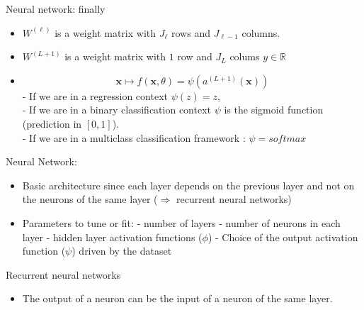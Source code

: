 \documentclass[ignorenonframetext,]{beamer}
\providecommand{\tightlist}{%
  \setlength{\itemsep}{0pt}\setlength{\parskip}{0pt}}
\begin{document}
\begin{frame}{Neural network: finally}
\protect\hypertarget{neural-network-finally}{}

\begin{itemize}
\tightlist
\item
  \(W^{(\ell)}\) is a weight matrix with \(J_{\ell}\) rows and
  \(J_{\ell-1}\) columns.\\
\item
  \(W^{(L+1)}\) is a weight matrix with \(1\) row and \(J_{L}\) colums
  \(y \in \mathbb{R}\)
\item
  \[\mathbf{x} \mapsto f(\mathbf{x},\theta) = \psi(a^{(L+1)}(\mathbf{x}))\]
  - If we are in a regression context \(\psi(z) = z\),\\
  - If we are in a binary classification context \(\psi\) is the sigmoid
  function (prediction in \([0,1]\)).\\
  - If we are in a multiclass classification framework :
  \(\psi = softmax\)
\end{itemize}

\end{frame}

\begin{frame}{Neural Network:}
\protect\hypertarget{neural-network}{}

\begin{itemize}
\item
  Basic architecture since each layer depends on the previous layer and
  not on the neurons of the same layer (\(\Rightarrow\) recurrent neural
  networks)
\item
  Parameters to tune or fit: - number of layers - number of neurons in
  each layer - hidden layer activation functions (\(\phi\)) - Choice of
  the output activation function (\(\psi\)) driven by the dataset
\end{itemize}

\end{frame}

\begin{frame}{Recurrent neural networks}
\protect\hypertarget{recurrent-neural-networks}{}

\begin{itemize}
\tightlist
\item
  The output of a neuron can be the input of a neuron of the same layer.
\end{itemize}

\end{frame}
\end{document}
